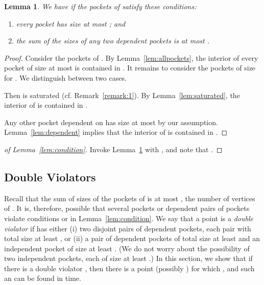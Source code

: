 \documentclass[12pt]{article}
\newtheorem{lemma}{Lemma}
\begin{document}
\begin{lemma}\label{lem:condition+}
We have  if the pockets of  satisfy these conditions:
\begin{enumerate}\itemsep -2pt
    \item every pocket has size at most ; and
    \item the sum of the sizes of any two dependent pockets is at most .
\end{enumerate}
\end{lemma}
\begin{proof}
Consider the pockets of . By Lemma~\ref{lem:allpockets},
the interior of every pocket of size at most  is contained in .
It remains to consider the pockets  of size  for .
We distinguish between two cases.

 Then  is saturated (cf. Remark~\ref{remark:1}).
By Lemma~\ref{lem:saturated}, the interior of  is
contained in .

Any other pocket dependent on  has size at most
   by our assumption.
Lemma~\ref{lem:dependent} implies that
  the interior of  is contained in .
\end{proof}

\begin{proof}[of Lemma~\ref{lem:condition}]
Invoke Lemma~\ref{lem:condition+} with , and note that .
\end{proof}

\subsection{Double Violators}
\label{ssec:double}

Recall that the sum of sizes of the pockets of  is at most , the number of vertices of .
It is, therefore, possible that several pockets or dependent pairs of pockets violate
conditions  or  in Lemma~\ref{lem:condition}.
We say that a point  is a
\emph{double violator} if  has either (i) two disjoint pairs of dependent pockets, each
pair with total size at least , or (ii) a pair of dependent pockets of total size at
least  and an independent pocket of size at least . (We do not worry
about the possibility of two independent pockets, each of size at least .)
In this section, we show that if there is a double violator
, then there is a point  (possibly ) for which
, and such an  can be found in  time.
\end{document}
